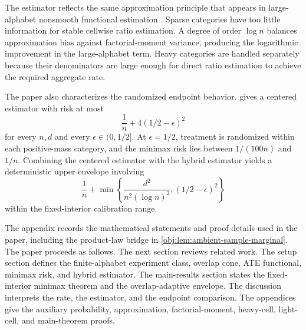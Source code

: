 The estimator reflects the same approximation principle that appears in large-alphabet nonsmooth functional estimation \citep{Paninski2003,JiaoVenkatHanWeissman2015,WuYang2016,HanJiaoWeissman2020}. Sparse categories have too little information for stable cellwise ratio estimation. A degree of order \(\log n\) balances approximation bias against factorial-moment variance, producing the logarithmic improvement in the large-alphabet term. Heavy categories are handled separately because their denominators are large enough for direct ratio estimation to achieve the required aggregate rate.

The paper also characterizes the randomized endpoint behavior.  gives a centered estimator with risk at most
\[
\frac1n+4(1/2-\epsilon)^2
\]
for every \(n,d\) and every \(\epsilon\in(0,1/2]\). At \(\epsilon=1/2\), treatment is randomized within each positive-mass category, and the minimax risk lies between \(1/(100n)\) and \(1/n\). Combining the centered estimator with the hybrid estimator yields a deterministic upper envelope involving
\[
\frac1n+
\min\left\{
\frac{d^2}{n^2(\log n)^2},(1/2-\epsilon)^2
\right\}
\]
within the fixed-interior calibration range.

The appendix records the mathematical statements and proof details used in the paper, including the product-law bridge in \cref{obj:lem:ambient-sample-marginal}. The paper proceeds as follows. The next section reviews related work. The setup section defines the finite-alphabet experiment class, overlap cone, ATE functional, minimax risk, and hybrid estimator. The main-results section states the fixed-interior minimax theorem and the overlap-adaptive envelope. The discussion interprets the rate, the estimator, and the endpoint comparison. The appendices give the auxiliary probability, approximation, factorial-moment, heavy-cell, light-cell, and main-theorem proofs.
